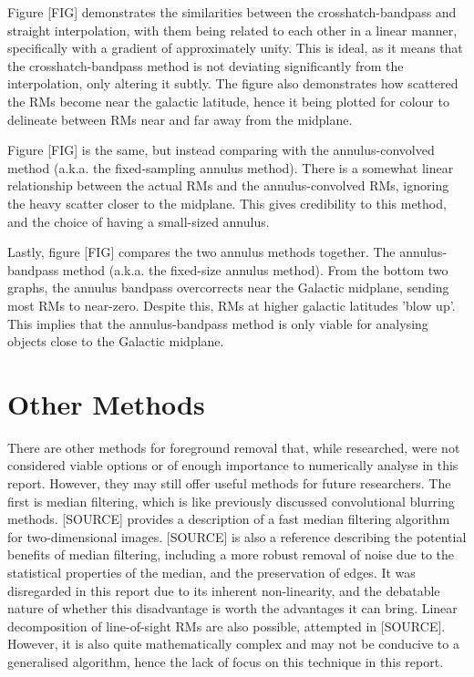 Figure [FIG] demonstrates the similarities between the crosshatch-bandpass and straight interpolation, with them being related to each other in a linear manner, specifically with a gradient of approximately unity. This is ideal, as it means that the crosshatch-bandpass method is not deviating significantly from the interpolation, only altering it subtly. The figure also demonstrates how scattered the RMs become near the galactic latitude, hence it being plotted for colour to delineate between RMs near and far away from the midplane.


Figure [FIG] is the same, but instead comparing with the annulus-convolved method (a.k.a. the fixed-sampling annulus method). There is a somewhat linear relationship between the actual RMs and the annulus-convolved RMs, ignoring the heavy scatter closer to the midplane. This gives credibility to this method, and the choice of having a small-sized annulus.


Lastly, figure [FIG] compares the two annulus methods together. The annulus-bandpass method (a.k.a. the fixed-size annulus method). From the bottom two graphs, the annulus bandpass overcorrects near the Galactic midplane, sending most RMs to near-zero. Despite this, RMs at higher galactic latitudes 'blow up'. This implies that the annulus-bandpass method is only viable for analysing objects close to the Galactic midplane. 

\section{Other Methods}
\label{sec:other_methods}

There are other methods for foreground removal that, while researched, were not considered viable options or of enough importance to numerically analyse in this report. However, they may still offer useful methods for future researchers. The first is median filtering, which is like previously discussed convolutional blurring methods. [SOURCE] provides a description of a fast median filtering algorithm for two-dimensional images. [SOURCE] is also a reference describing the potential benefits of median filtering, including a more robust removal of noise due to the statistical properties of the median, and the preservation of edges. It was disregarded in this report due to its inherent non-linearity, and the debatable nature of whether this disadvantage is worth the advantages it can bring. Linear decomposition of line-of-sight RMs are also possible, attempted in [SOURCE]. However, it is also quite mathematically complex and may not be conducive to a generalised algorithm, hence the lack of focus on this technique in this report.


